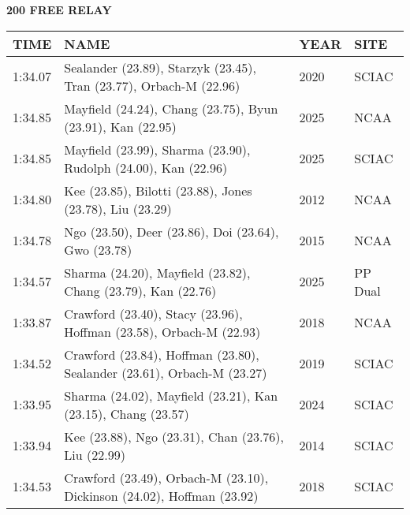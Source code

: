 \vspace{0.4cm}

\begin{center}
\begin{minipage}[t]{0.7\textwidth}
\centering
\textbf{200 FREE RELAY}\\[0.05cm]
\begin{tabular}{@{}p{1.8cm}p{2.8cm}p{1.2cm}p{1.4cm}@{}}
\hline
\textbf{TIME} & \textbf{NAME} & \textbf{YEAR} & \textbf{SITE} \\
\hline
1:34.07 & Sealander (23.89), Starzyk (23.45), Tran (23.77), Orbach-M (22.96) & 2020 & SCIAC \\
1:34.85 & Mayfield (24.24), Chang (23.75), Byun (23.91), Kan (22.95) & 2025 & NCAA \\
1:34.85 & Mayfield (23.99), Sharma (23.90), Rudolph (24.00), Kan (22.96) & 2025 & SCIAC \\
1:34.80 & Kee (23.85), Bilotti (23.88), Jones (23.78), Liu (23.29) & 2012 & NCAA \\
1:34.78 & Ngo (23.50), Deer (23.86), Doi (23.64), Gwo (23.78) & 2015 & NCAA \\
1:34.57 & Sharma (24.20), Mayfield (23.82), Chang (23.79), Kan (22.76) & 2025 & PP Dual \\
1:33.87 & Crawford (23.40), Stacy (23.96), Hoffman (23.58), Orbach-M (22.93) & 2018 & NCAA \\
1:34.52 & Crawford (23.84), Hoffman (23.80), Sealander (23.61), Orbach-M (23.27) & 2019 & SCIAC \\
1:33.95 & Sharma (24.02), Mayfield (23.21), Kan (23.15), Chang (23.57) & 2024 & SCIAC \\
1:33.94 & Kee (23.88), Ngo (23.31), Chan (23.76), Liu (22.99) & 2014 & SCIAC \\
1:34.53 & Crawford (23.49), Orbach-M (23.10), Dickinson (24.02), Hoffman (23.92) & 2018 & SCIAC \\
\hline
\end{tabular}
\end{minipage}
\end{center}

\vspace{0.4cm}

